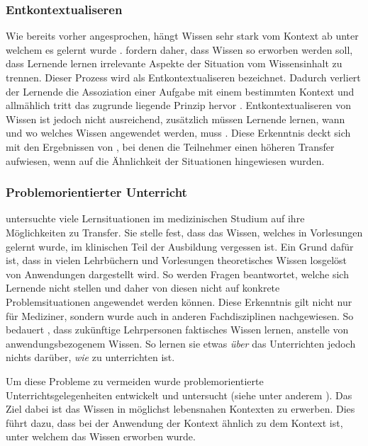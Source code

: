 \subsubsection{Entkontextualiseren}

Wie bereits vorher angesprochen, hängt Wissen sehr stark vom Kontext ab unter welchem es gelernt wurde \citep{Godden1975,Schoenfeld1988}. \citet{Anderson1996} fordern daher, dass Wissen so erworben werden soll, dass Lernende lernen irrelevante Aspekte der Situation vom Wissensinhalt zu trennen. Dieser Prozess wird als Entkontextualiseren bezeichnet. Dadurch verliert der Lernende die Assoziation einer Aufgabe mit einem bestimmten Kontext und allmählich tritt das zugrunde liegende Prinzip hervor \citep{Perkins1989}. Entkontextualiseren von Wissen ist jedoch nicht ausreichend, zusätzlich müssen Lernende lernen, wann und wo welches Wissen angewendet werden, muss \citep{Wiggins1993}. Diese Erkenntnis deckt sich mit den Ergebnissen von \citet{Gick1980}, bei denen die Teilnehmer einen höheren Transfer aufwiesen, wenn auf die Ähnlichkeit der Situationen hingewiesen wurden.


\subsubsection{Problemorientierter Unterricht}

\citet{Williams1992} untersuchte viele Lernsituationen im medizinischen Studium auf ihre Möglichkeiten zu Transfer. Sie stelle fest, dass das Wissen, welches in Vorlesungen gelernt wurde, im klinischen Teil der Ausbildung vergessen ist. Ein Grund dafür ist, dass in vielen Lehrbüchern und Vorlesungen theoretisches Wissen losgelöst von Anwendungen dargestellt wird. So werden Fragen beantwortet, welche sich Lernende nicht stellen und daher von diesen nicht auf konkrete Problemsituationen angewendet werden können.
Diese Erkenntnis gilt nicht nur für Mediziner, sondern wurde auch in anderen Fachdisziplinen nachgewiesen. So bedauert \citet{Shuell1996}, dass zukünftige Lehrpersonen faktisches Wissen lernen, anstelle von anwendungsbezogenem Wissen. So lernen sie etwas \textit{über} das Unterrichten jedoch nichts darüber, \textit{wie} zu unterrichten ist.

Um diese Probleme zu vermeiden wurde problemorientierte Unterrichtsgelegenheiten entwickelt und untersucht (siehe unter anderem \citet{Barrows1985,Michael1993,Shuell1996,Corte2003,Reusser2005,Fassler2007,Pea2013b}). Das Ziel dabei ist das Wissen in möglichst lebensnahen Kontexten zu erwerben. Dies führt dazu, dass bei der Anwendung der Kontext ähnlich zu dem Kontext ist, unter welchem das Wissen erworben wurde.

